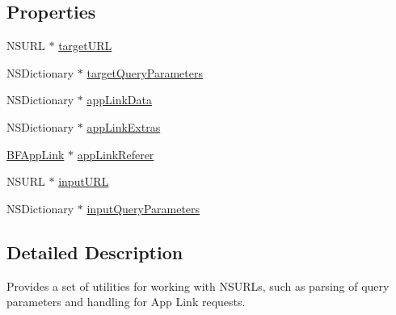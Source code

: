 \subsection*{Properties}
\begin{DoxyCompactItemize}
\item 
N\-S\-U\-R\-L $\ast$ \hyperlink{interface_b_f_u_r_l_aa83698fb8e97cde89f07f2a27dd453b9}{target\-U\-R\-L}
\item 
N\-S\-Dictionary $\ast$ \hyperlink{interface_b_f_u_r_l_a874bc9b6e197567616676e7c35882312}{target\-Query\-Parameters}
\item 
N\-S\-Dictionary $\ast$ \hyperlink{interface_b_f_u_r_l_a7f41095ee721d9b4beae17f9fd9aafe5}{app\-Link\-Data}
\item 
N\-S\-Dictionary $\ast$ \hyperlink{interface_b_f_u_r_l_a47ef1fbe340b610c07b6f80e0c3c16ab}{app\-Link\-Extras}
\item 
\hyperlink{interface_b_f_app_link}{B\-F\-App\-Link} $\ast$ \hyperlink{interface_b_f_u_r_l_a0256b0b7763ce81aa3556c13d2363f57}{app\-Link\-Referer}
\item 
N\-S\-U\-R\-L $\ast$ \hyperlink{interface_b_f_u_r_l_a588a05e6eaedf5f9b17ce0f85edbef20}{input\-U\-R\-L}
\item 
N\-S\-Dictionary $\ast$ \hyperlink{interface_b_f_u_r_l_a03a744a57286fa44530dcfc5528fa49d}{input\-Query\-Parameters}
\end{DoxyCompactItemize}


\subsection{Detailed Description}
Provides a set of utilities for working with N\-S\-U\-R\-Ls, such as parsing of query parameters and handling for App Link requests. 

